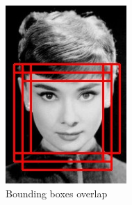 \begin{figure}[!h]
	\centering
	\begin{subfigure}{.14\linewidth}
		\includegraphics[width=0.9\linewidth]{images/img1_noNMS}
		\caption{Bounding boxes overlap}
		\label{fig:sub_noNMS}
	\end{subfigure}
	\begin{subfigure}{.14\linewidth}

\end{subfigure}
\end{figure}
